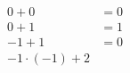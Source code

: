 \documentclass[preview]{standalone}
\begin{document}
\begin{align*}
0+0 & = 0\\ 0+1 & = 1\\ -1 + 1 & = 0\\ -1\cdot (-1) + 2
\end{align*}
\end{document}
